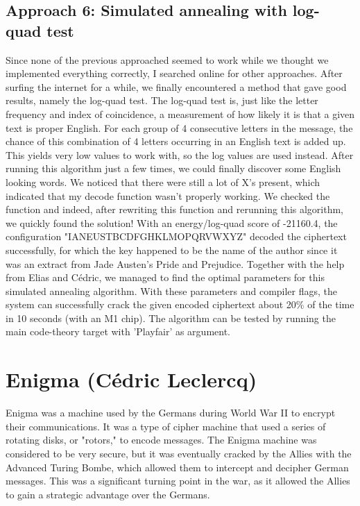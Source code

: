 \documentclass{article}
\begin{document}
\subsection{Approach 6: Simulated annealing with log-quad test}
Since none of the previous approached seemed to work while we thought we implemented everything correctly, I searched online for other approaches. After surfing the internet for a while, we finally encountered a method that gave good results, namely the log-quad test. The log-quad test is, just like the letter frequency and index of coincidence, a measurement of how likely it is that a given text is proper English. For each group of 4 consecutive letters in the message, the chance of this combination of 4 letters occurring in an English text is added up. This yields very low values to work with, so the log values are used instead. After running this algorithm just a few times, we could finally discover some English looking words. We noticed that there were still a lot of X's present, which indicated that my decode function wasn't properly working. We checked the function and indeed, after rewriting this function and rerunning this algorithm, we quickly found the solution! With an energy/log-quad score of -21160.4, the configuration "IANEUSTBCDFGHKLMOPQRVWXYZ" decoded the ciphertext successfully, for which the key happened to be the name of the author since it was an extract from Jade Austen's Pride and Prejudice. Together with the help from Elias and Cédric, we managed to find the optimal parameters for this simulated annealing algorithm. With these parameters and compiler flags, the system can successfully crack the given encoded ciphertext about 20\% of the time in 10 seconds (with an M1 chip). The algorithm can be tested by running the main code-theory target with 'Playfair' as argument.

\newpage

\section{Enigma (Cédric Leclercq)}

Enigma was a machine used by the Germans during World War II to encrypt their communications. It was a type of cipher machine that used a series of rotating disks, or "rotors," to encode messages. The Enigma machine was considered to be very secure, but it was eventually cracked by the Allies with the Advanced Turing Bombe, which allowed them to intercept and decipher German messages. This was a significant turning point in the war, as it allowed the Allies to gain a strategic advantage over the Germans.\\
\end{document}
